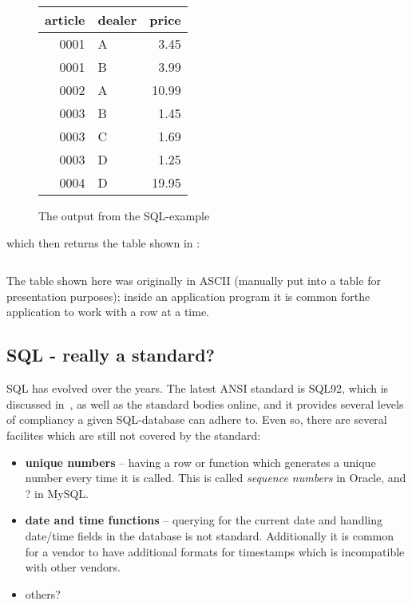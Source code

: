 \begin{figure}[htbp]
  \begin{center}
    \begin{tabular}{|r|l|r|}
\hline\hline
 article & dealer & price\\
\hline
    0001 & A      &  3.45\\
    0001 & B      &  3.99\\
    0002 & A      & 10.99\\
    0003 & B      &  1.45\\
    0003 & C      &  1.69\\
    0003 & D      &  1.25\\
    0004 & D      & 19.95\\
\hline
    \end{tabular}

    \caption{The output from the SQL-example}
    \label{fig:mysql-tutorial-example-output}
  \end{center}
\end{figure}
which then returns the table shown in :

\begin{verbatim}
\end{verbatim}

The table shown here was originally in ASCII (manually put into a
table for presentation purposes); inside an application program it is
common forthe application to work with a row at a time.


\subsection{SQL - really a standard?}
\label{sec:how-standardized-is-sql}

SQL has evolved over the years.  The latest ANSI standard is SQL92,
which is discussed in~\cite{understanding-the-new-sql}, \textsf{as
  well as the standard bodies online}, and it provides several levels
of compliancy a given SQL-database can adhere to.  Even so, there are
several facilites which are still not covered by the standard:

\begin{itemize}
\item \textbf{unique numbers} -- having a row or function which
  generates a unique number every time it is called.  This is called
  \textit{sequence numbers} in Oracle, and \textsf{?} in MySQL.
\item \textbf{date and time functions} -- querying for the current
  date and handling date/time fields in the database is not standard.
  Additionally it is common for a vendor to have additional formats
  for timestamps which is incompatible with other vendors.
\item \textsf{others?}
\end{itemize}


